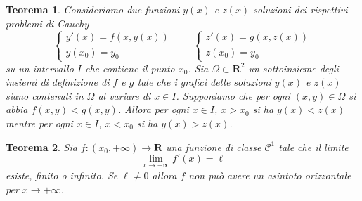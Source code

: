 \documentclass[italian,a4paper]{article}
\newcommand{\R}{\mathbf{R}}
\newtheorem{theorem}{Teorema}[section]
\begin{document}
\begin{theorem}
Consideriamo due funzioni $y(x)$ e $z(x)$ soluzioni dei rispettivi
problemi di Cauchy
\[
\begin{cases}
  y'(x)  = f(x,y(x))\\
  y(x_0) = y_0
\end{cases}
\qquad
\begin{cases}
  z'(x) = g(x,z(x))\\
  z(x_0) = y_0
\end{cases}
\] 
su un intervallo $I$ che contiene il punto $x_0$. 
Sia $\Omega\subset \R^2$ un sottoinsieme degli insiemi di definizione
di $f$ e $g$ tale che i grafici delle soluzioni $y(x)$ e $z(x)$ siano
contenuti in $\Omega$ al variare di $x\in I$. 
Supponiamo che per ogni $(x,y)\in\Omega$ si abbia $f(x,y)<g(x,y)$.
Allora per ogni $x\in I$, $x> x_0$ si ha $y(x)< z(x)$ mentre per ogni
$x\in I$, $x<x_0$ si ha $y(x)>z(x)$.
\end{theorem}

\begin{theorem}
Sia $f\colon (x_0,+\infty)\to \R$ una funzione di classe $\mathcal C^1$ tale
che il limite
\[
  \lim_{x\to +\infty} f'(x) = \ell 
\]
esiste, finito o infinito. Se $\ell\neq 0$ allora $f$ non pu\`o avere
un asintoto orizzontale per $x\to +\infty$.
\end{theorem}
\end{document}
